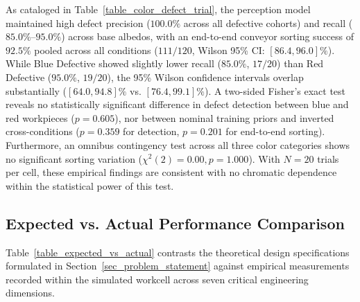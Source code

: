\documentclass[journal]{IEEEtran}
\begin{document}
As cataloged in Table~\ref{table_color_defect_trial}, the perception model maintained high defect precision ($100.0\%$ across all defective cohorts) and recall ($85.0\%\text{--}95.0\%$) across base albedos, with an end-to-end conveyor sorting success of $92.5\%$ pooled across all conditions ($111/120$, Wilson 95\% CI: $[86.4, 96.0]\%$). While Blue Defective showed slightly lower recall ($85.0\%$, $17/20$) than Red Defective ($95.0\%$, $19/20$), the 95\% Wilson confidence intervals overlap substantially ($[64.0, 94.8]\%$ vs. $[76.4, 99.1]\%$). A two-sided Fisher's exact test reveals no statistically significant difference in defect detection between blue and red workpieces ($p = 0.605$), nor between nominal training priors and inverted cross-conditions ($p = 0.359$ for detection, $p = 0.201$ for end-to-end sorting). Furthermore, an omnibus contingency test across all three color categories shows no significant sorting variation ($\chi^2(2) = 0.00, p = 1.000$). With $N=20$ trials per cell, these empirical findings are consistent with no chromatic dependence within the statistical power of this test.

\subsection{Expected vs. Actual Performance Comparison}
Table~\ref{table_expected_vs_actual} contrasts the theoretical design specifications formulated in Section~\ref{sec_problem_statement} against empirical measurements recorded within the simulated workcell across seven critical engineering dimensions.
\end{document}
